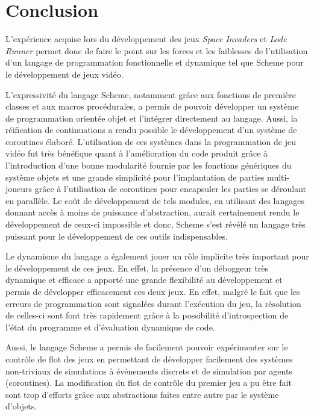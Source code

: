 \documentclass[12pt,oneside,letterpaper,francais]{book}
\newcommand{\lr}{{\textit{Lode Runner }}}
\newcommand{\si}{{\textit{Space Invaders }}}
\begin{document}
\chapter{Conclusion}


L'expérience acquise lors du développement des jeux \si et \lr permet
donc de faire le point sur les forces et les faiblesses de
l'utilisation d'un langage de programmation fonctionnelle et dynamique
tel que Scheme pour le développement de jeux vidéo.

L'expressivité du langage Scheme, notamment grâce aux fonctions de
première classes et aux macros procédurales, a permis de pouvoir
développer un système de programmation orientée objet et l'intégrer
directement au langage. Aussi, la réification de continuations a rendu
possible le développement d'un système de coroutines élaboré.
L'utilisation de ces systèmes dans la programmation de jeu vidéo fut
très bénéfique quant à l'amélioration du code produit grâce à
l'introduction d'une bonne modularité fournie par les fonctions
génériques du système objets et une grande simplicité pour
l'implantation de parties multi-joueurs grâce à l'utilisation de
coroutines pour encapsuler les parties se déroulant en parallèle. Le
coût de développement de tels modules, en utilisant des langages
donnant accès à moins de puissance d'abstraction, aurait certainement
rendu le développement de ceux-ci impossible et donc, Scheme s'est
révélé un langage très puissant pour le développement de ces outils
indispensables.

Le dynamisme du langage a également jouer un rôle implicite très
important pour le développement de ces jeux. En effet, la présence
d'un déboggeur très dynamique et efficace a apporté une grande
flexibilité au développement et permis de développer efficacement ces
deux jeux. En effet, malgré le fait que les erreurs de programmation
sont signalées durant l'exécution du jeu, la résolution de celles-ci
sont font très rapidement grâce à la possibilité d'introspection de
l'état du programme et d'évaluation dynamique de code.

Aussi, le langage Scheme a permis de facilement pouvoir expérimenter
sur le contrôle de flot des jeux en permettant de développer
facilement des systèmes non-triviaux de simulations à événements
discrets et de simulation par agents (coroutines). La modification du
flot de contrôle du premier jeu a pu être fait sont trop d'efforts
grâce aux abstractions faites entre autre par le système d'objets.
\end{document}
